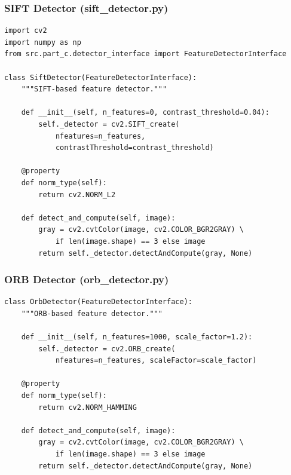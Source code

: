 \documentclass[a4paper,12pt]{article}
\begin{document}
\subsubsection*{SIFT Detector (sift\_detector.py)}
\begin{lstlisting}
import cv2
import numpy as np
from src.part_c.detector_interface import FeatureDetectorInterface

class SiftDetector(FeatureDetectorInterface):
    """SIFT-based feature detector."""

    def __init__(self, n_features=0, contrast_threshold=0.04):
        self._detector = cv2.SIFT_create(
            nfeatures=n_features,
            contrastThreshold=contrast_threshold)

    @property
    def norm_type(self):
        return cv2.NORM_L2

    def detect_and_compute(self, image):
        gray = cv2.cvtColor(image, cv2.COLOR_BGR2GRAY) \
            if len(image.shape) == 3 else image
        return self._detector.detectAndCompute(gray, None)
\end{lstlisting}

\subsubsection*{ORB Detector (orb\_detector.py)}
\begin{lstlisting}
class OrbDetector(FeatureDetectorInterface):
    """ORB-based feature detector."""

    def __init__(self, n_features=1000, scale_factor=1.2):
        self._detector = cv2.ORB_create(
            nfeatures=n_features, scaleFactor=scale_factor)

    @property
    def norm_type(self):
        return cv2.NORM_HAMMING

    def detect_and_compute(self, image):
        gray = cv2.cvtColor(image, cv2.COLOR_BGR2GRAY) \
            if len(image.shape) == 3 else image
        return self._detector.detectAndCompute(gray, None)
\end{lstlisting}
\end{document}
